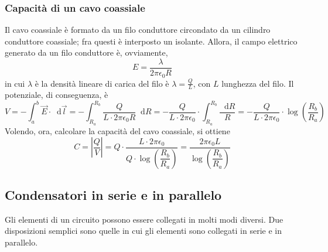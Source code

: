\documentclass[a4paper]{extarticle}
\newcommand\dif{\mathop{}\!\mathrm{d}}
\begin{document}
\vspace{1em}
\noindent
\subsubsection{Capacità di un cavo coassiale}
Il cavo coassiale è formato da un filo conduttore circondato da un cilindro conduttore coassiale; fra questi è interposto un isolante. Allora, il campo elettrico generato da un filo conduttore è, ovviamente,
\[E=\frac{\lambda}{2 \pi \epsilon_0 R}\]
in cui $\lambda$ è la densità lineare di carica del filo è $\lambda=\frac{Q}{L}$, con $L$ lunghezza del filo. Il potenziale, di conseguenza, è
\[V=-\int_a^b \vec E \cdot \dif \vec l = -\int_{R_a}^{R_b} \frac{Q}{L \cdot 2 \pi \epsilon_0 R} \dif R = -\frac{Q}{L \cdot 2 \pi \epsilon_0} \cdot \int_{R_a}^{R_b} \frac{\dif R}{R} = -\frac{Q}{L \cdot 2 \pi \epsilon_0} \cdot \log \left(\frac{R_b}{R_a}\right)\]
Volendo, ora, calcolare la capacità del cavo coassiale, si ottiene
\[C=\left \vert \dfrac{Q}{V} \right \vert = Q \cdot \frac{L \cdot 2 \pi \epsilon_0}{Q \cdot \log \left(\dfrac{R_b}{R_a}\right)} = \dfrac{2\pi \epsilon_0 L}{\log \left(\dfrac{R_b}{R_a}\right)}\]

\vspace{1em}
\noindent
\subsection{Condensatori in serie e in parallelo}
Gli elementi di un circuito possono essere collegati in molti modi diversi. Due disposizioni semplici sono quelle in cui gli elementi sono collegati in serie e in parallelo.

\vspace{1em}
\noindent
\end{document}
